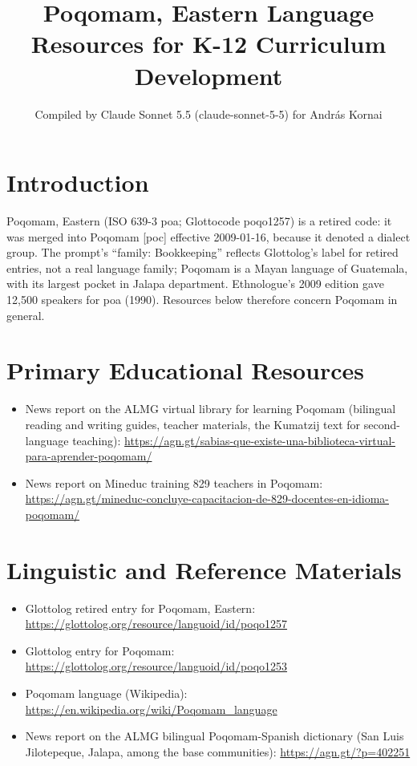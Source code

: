 \documentclass[12pt]{article}
\title{Poqomam, Eastern Language Resources for K-12 Curriculum Development}
\author{Compiled by Claude Sonnet 5.5 (claude-sonnet-5-5) for Andr\'as Kornai}
\date{}
\begin{document}
\maketitle

\section{Introduction}
Poqomam, Eastern (ISO 639-3 poa; Glottocode poqo1257) is a retired code: it was merged into Poqomam [poc] effective 2009-01-16, because it denoted a dialect group. The prompt's ``family: Bookkeeping'' reflects Glottolog's label for retired entries, not a real language family; Poqomam is a Mayan language of Guatemala, with its largest pocket in Jalapa department. Ethnologue's 2009 edition gave 12,500 speakers for poa (1990). Resources below therefore concern Poqomam in general.

\section{Primary Educational Resources}
\begin{itemize}
\item News report on the ALMG virtual library for learning Poqomam (bilingual reading and writing guides, teacher materials, the Kumatzij text for second-language teaching): \url{https://agn.gt/sabias-que-existe-una-biblioteca-virtual-para-aprender-poqomam/}
\item News report on Mineduc training 829 teachers in Poqomam: \url{https://agn.gt/mineduc-concluye-capacitacion-de-829-docentes-en-idioma-poqomam/}
\end{itemize}

\section{Linguistic and Reference Materials}
\begin{itemize}
\item Glottolog retired entry for Poqomam, Eastern: \url{https://glottolog.org/resource/languoid/id/poqo1257}
\item Glottolog entry for Poqomam: \url{https://glottolog.org/resource/languoid/id/poqo1253}
\item Poqomam language (Wikipedia): \url{https://en.wikipedia.org/wiki/Poqomam_language}
\item News report on the ALMG bilingual Poqomam-Spanish dictionary (San Luis Jilotepeque, Jalapa, among the base communities): \url{https://agn.gt/?p=402251}
\end{itemize}
\end{document}
